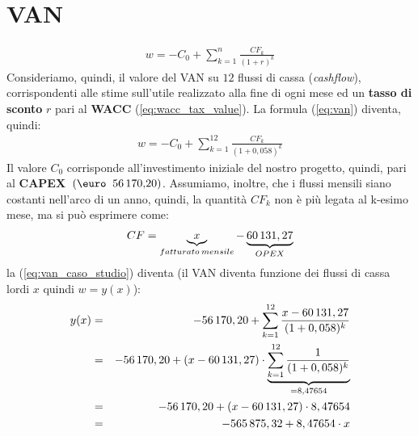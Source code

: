 \section[VAN]{VAN}
	\begin{equation}
	\label{eq:van}
	\begin{split}
 		w = - C_0 + \sum_{k=1}^n \frac{CF_k}{(1+r)^k}
	\end{split}
	\end{equation}
	Consideriamo, quindi, il valore del \ac{VAN} su $12$ flussi di cassa (\textit{cashflow}), corrispondenti alle stime sull'utile realizzato alla fine di ogni mese ed un \textbf{tasso di sconto} $r$ pari al \textbf{\ac{WACC}} (\ref{eq:wacc_tax_value}).\newline
	La formula (\ref{eq:van}) diventa, quindi:	
	\begin{equation}
	\label{eq:van_caso_studio}
	\begin{split}
 		w = - C_0 + \sum_{k=1}^{12} \frac{CF_k}{(1+0,058)^k}
	\end{split}
	\end{equation}	
	Il valore $C_0$ corrisponde all'investimento iniziale del nostro progetto, quindi, pari al \textbf{CAPEX} $\:(\mbox{\euro\: 56\thinspace 170,20})$.
	Assumiamo, inoltre, che i flussi mensili siano costanti nell'arco di un anno, quindi, la quantità $CF_k$ non è più legata al k-esimo mese, ma si può esprimere come:
	\begin{equation}
	\label{eq:flussi_cassa_mensili}
	\begin{split}
 		CF = \underbrace{x}_{fatturato \: mensile} - \underbrace{60\thinspace 131,27}_{OPEX}
	\end{split}
	\end{equation}	  	
la (\ref{eq:van_caso_studio}) diventa (il VAN diventa funzione dei flussi di cassa lordi $x$ quindi $w = y(x)$):	
	\begin{eqnarray}
	\label{eq:van_caso_studio_2}
 		y(x) & = & - 56\thinspace 170,20 + \sum_{k=1}^{12} \frac{x - 60\thinspace 131,27}{(1+0,058)^k} \nonumber \\
 		 & = & -56\thinspace 170,20 + (x - 60\thinspace 131,27) \cdot \underbrace{\sum_{k=1}^{12} \frac{1} {(1+0,058)^{k}}}_{{}=8,47654} \nonumber \\
 		 & = & -56\thinspace 170,20 + (x - 60\thinspace 131,27) \cdot 8,47654 \nonumber \\
 		 & = & -565\thinspace 875,32 + 8,47654 \cdot x 		
	\end{eqnarray}  		


